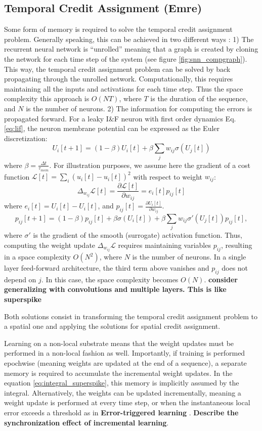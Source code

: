 \documentclass[journal,onecolumn,11pt]{IEEEtran}
\begin{document}
\subsection{Temporal Credit Assignment (Emre)}
Some form of memory is required to solve the temporal credit assignment problem. 
Generally speaking, this can be achieved in two different ways \cite{Williams_Zipser89_learalgo}:
1) The recurrent neural network is ``unrolled'' meaning that a graph is created by cloning the network for each time step of the system (see figure \ref{fig:snn_compgraph}). This way, the temporal credit assignment problem can be solved by back propagating through the unrolled network. Computationally, this requires maintaining all the inputs and activations for each time step. Thus the space complexity this approach is $O(N T)$, where $T$ is the duration of the sequence, and $N$ is the number of neurons.
2) The information for computing the errors is propagated forward.
For a leaky I\&F neuron with first order dynamics Eq. \ref{eq:lif}, the neuron membrane potential can be expressed as the Euler discretization:
\[
  U_i[t+1] = (1-\beta) U_i[t] + \beta \sum_j w_{ij} \sigma(U_j[t])
\]
where $\beta = \frac{\Delta t}{\tau_{mem}}$. For illustration purposes, we assume here the gradient of a cost function $\mathcal{L}[t] = \sum_i (u_i[t]-\hat{u_i}[t])^2$ with respect to weight $w_{ij}$:
\[
\Delta_{w_{ij}} \mathcal{L}[t] = \frac{\partial \mathcal{L}[t]}{\partial w_{ij}} = e_i[t] p_{ij}[t]
\]
where $e_i[t] = U_i[t]-\hat{U_i}[t]$, and $p_{ij}[t] = \frac{\partial U_i[t]} {\partial w_{ij}}$.
\[
 p_{ij}[t+1] = (1-\beta) p_{ij}[t] + \beta \sigma(U_i[t]) + \beta \sum_j w_{ij} \sigma'(U_j[t]) p_{ij}[t],
\]  
where $\sigma'$ is the gradient of the smooth (surrogate) activation function.
Thus, computing the weight update $\Delta_{w_{ij}} \mathcal{L}$ requires maintaining variables $p_{ij}$, resulting in a space complexity $O(N^2)$, where $N$ is the number of neurons. In a single layer feed-forward architecture, the third term above vanishes and $p_{ij}$ does not depend on $j$. In this case, the space complexity becomes $O(N)$. 
\textbf{consider generalizing with convolutions and multiple layers. This is like superspike}

Both solutions consist in transforming the temporal credit assignment problem to a spatial one and applying the solutions for spatial credit assignment.

Learning on a non-local substrate means that the weight updates must be performed in a non-local fashion as well. Importantly, if training is performed epochwise (meaning weights are updated at the end of a sequence), a separate memory is required to accumulate the incremental weight updates. In the equation \ref{eq:integral_superspike}, this memory is implicitly assumed by the integral. Alternatively, the weights can be updated incrementally, meaning a weight update is performed at every time step, or when the instantaneous local error exceeds a threshold as in 
\textbf{Error-triggered learning} \cite{Neftci18_datapowe}.
\textbf{Describe the synchronization effect of incremental learning}.
\end{document}

